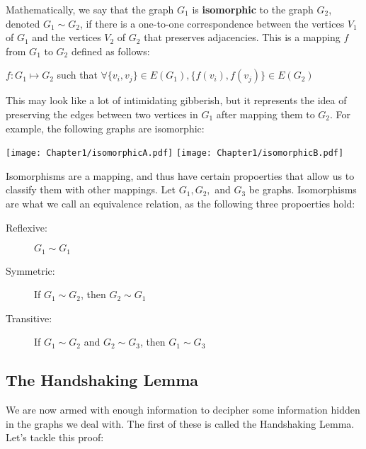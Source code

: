 Mathematically, we say that the graph $G_1$ is \textbf{isomorphic} to the graph $G_2$, denoted $G_1 \sim G_2$, if there is a one-to-one correspondence between the vertices $V_1$ of $G_1$ and the vertices $V_2$ of $G_2$ that preserves adjacencies. This is a mapping $f$ from $G_1$ to $G_2$ defined as follows:
\begin{center}
    $f : G_1 \mapsto G_2$ such that $\forall \{v_i, v_j\} \in E(G_1), \{f(v_i), f(v_j)\} \in E(G_2)$
\end{center}
This may look like a lot of intimidating gibberish, but it represents the idea of preserving the edges between two vertices in $G_1$ after mapping them to $G_2$. For example, the following graphs are isomorphic:
\begin{center}
    \texttt{[image: Chapter1/isomorphicA.pdf]} %
    \texttt{[image: Chapter1/isomorphicB.pdf]} %
\end{center}
Isomorphisms are a mapping, and thus have certain propoerties that allow us to classify them with other mappings. Let $G_1, G_2,$ and $G_3$ be graphs. Isomorphisms are what we call an equivalence relation, as the following three propoerties hold:
\begin{description}
    \item[Reflexive:] $G_1 \sim G_1$
    \item[Symmetric:] If $G_1 \sim G_2$, then $G_2 \sim G_1$
    \item[Transitive:] If $G_1 \sim G_2$ and $G_2 \sim G_3$, then $G_1 \sim G_3$
\end{description}

\subsection{The Handshaking Lemma}
We are now armed with enough information to decipher some information hidden in the graphs we deal with. The first of these is called the Handshaking Lemma. Let's tackle this proof:


